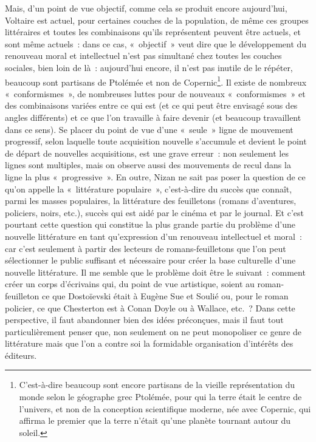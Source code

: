 \documentclass[french,twoside]{book} %
\begin{document}
Mais, d’un point de vue objectif, comme cela se produit encore aujourd’hui, Voltaire est actuel, pour certaines couches de la population, de même ces groupes littéraires et toutes les combinaisons qu’ils représentent peuvent être actuels, et sont même actuels : dans ce cas, « objectif » veut dire que le développement du renouveau moral et intellectuel n’est pas simultané chez toutes les couches sociales, bien loin de là : aujourd’hui encore, il n’est pas inutile de le répéter, beaucoup sont partisans de Ptolémée et non de Copernic\footnote{C'est-à-dire beaucoup sont encore partisans de la vieille représentation du monde selon le géographe grec Ptolémée, pour qui la terre était le centre de l’univers, et non de la conception scientifique moderne, née avec Copernic, qui affirma le premier que la terre n’était qu’une planète tournant autour du soleil.}. Il existe de nombreux « conformismes », de nombreuses luttes pour de nouveaux « conformismes » et des combinaisons variées entre ce qui est (et ce qui peut être envisagé sous des angles différents) et ce que l’on travaille à faire devenir (et beaucoup travaillent dans ce sens). Se placer du point de vue d’une « seule » ligne de mouvement progressif, selon laquelle toute acquisition nouvelle s’accumule et devient le point de départ de nouvelles acquisitions, est une grave erreur : non seulement les lignes sont multiples, mais on observe aussi des mouvements de recul dans la ligne la plus « progressive ». En outre, Nizan ne sait pas poser la question de ce qu’on appelle la « littérature populaire », c’est-à-dire du succès que connaît, parmi les masses populaires, la littérature des feuilletons (romans d’aventures, policiers, noirs, etc.), succès qui est aidé par le cinéma et par le journal. Et c’est pourtant cette question qui constitue la plus grande partie du problème d’une nouvelle littérature en tant qu’expression d’un renouveau intellectuel et moral : car c’est seulement à partir des lecteurs de romans-feuilletons que l’on peut sélectionner le public suffisant et nécessaire pour créer la base culturelle d’une nouvelle littérature. Il me semble que le problème doit être le suivant : comment créer un corps d’écrivains qui, du point de vue artistique, soient au roman-feuilleton ce que Dostoïevski était à Eugène Sue et Soulié ou, pour le roman policier, ce que Chesterton est à Conan Doyle ou à Wallace, etc. ? Dans cette perspective, il faut abandonner bien des idées préconçues, mais il faut tout particulièrement penser que, non seulement on ne peut monopoliser ce genre de littérature mais que l’on a contre soi la formidable organisation d’intérêts des éditeurs.\par
\end{document}
